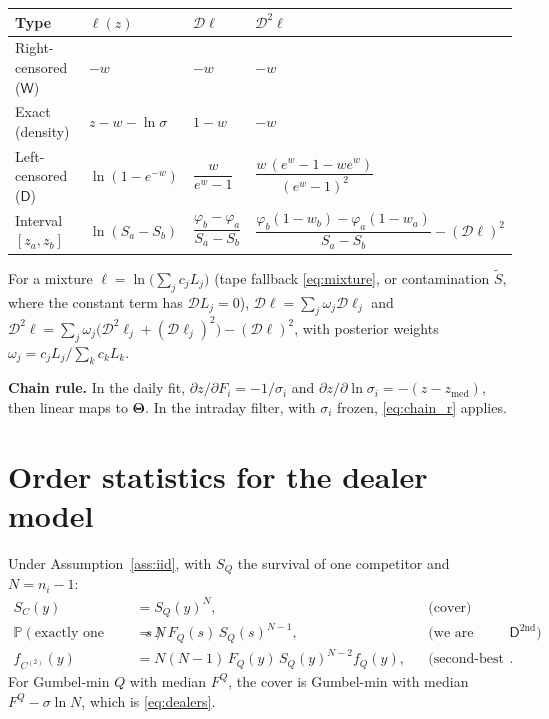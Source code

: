 \documentclass[11pt,a4paper]{article}
\theoremstyle{definition}
\theoremstyle{remark}
\newcommand{\Prob}{\mathbb{P}}
\newcommand{\zm}{z_{\mathrm{med}}}
\newcommand{\btheta}{\bm{\Theta}}
\newcommand{\Win}{\mathsf{W}}
\newcommand{\Dn}{\mathsf{D}}
\newcommand{\Dcv}{\mathsf{D}^{\mathrm{2nd}}}
\begin{document}
\begin{center}\small
\renewcommand{\arraystretch}{1.6}
\begin{tabular}{llll}
\toprule
Type & $\ell(z)$ & $\mathcal D\ell$ & $\mathcal D^2\ell$ \\
\midrule
Right-censored ($\Win$) & $-w$ & $-w$ & $-w$ \\
Exact (density) & $z-w-\ln\sigma$ & $1-w$ & $-w$ \\
Left-censored ($\Dn$) & $\ln(1-e^{-w})$ & $\dfrac{w}{e^{w}-1}$ & $\dfrac{w\,(e^{w}-1-we^{w})}{(e^{w}-1)^2}$ \\
Interval $[z_a,z_b]$ & $\ln(S_a-S_b)$ & $\dfrac{\varphi_b-\varphi_a}{S_a-S_b}$ & $\dfrac{\varphi_b(1-w_b)-\varphi_a(1-w_a)}{S_a-S_b}-(\mathcal D\ell)^2$ \\
\bottomrule
\end{tabular}
\end{center}

For a mixture $\ell=\ln\bigl(\sum_jc_jL_j\bigr)$ (tape fallback \eqref{eq:mixture}, or contamination $\tilde S$, where the constant term has $\mathcal D L_j=0$), $\mathcal D\ell=\sum_j\omega_j\mathcal D\ell_j$ and $\mathcal D^2\ell=\sum_j\omega_j\bigl(\mathcal D^2\ell_j+(\mathcal D\ell_j)^2\bigr)-(\mathcal D\ell)^2$, with posterior weights $\omega_j=c_jL_j/\sum_kc_kL_k$.

\textbf{Chain rule.} In the daily fit, $\partial z/\partial F_i=-1/\sigma_i$ and $\partial z/\partial\ln\sigma_i=-(z-\zm)$, then linear maps to $\btheta$. In the intraday filter, with $\sigma_i$ frozen, \eqref{eq:chain_r} applies.

\section{Order statistics for the dealer model}\label{app:orderstat}
Under Assumption~\ref{ass:iid}, with $S_Q$ the survival of one competitor and $N=n_i-1$:
\begin{align*}
S_C(y)&=S_Q(y)^{N}, &&\text{(cover)}\\
\Prob(\text{exactly one competitor below } s)&=N\,F_Q(s)\,S_Q(s)^{N-1}, &&\text{(we are second, $\Dcv$)}\\
f_{C^{(2)}}(y)&=N(N-1)\,F_Q(y)\,S_Q(y)^{N-2}f_Q(y), &&\text{(second-best competitor)}.
\end{align*}
For Gumbel-min $Q$ with median $F^Q$, the cover is Gumbel-min with median $F^Q-\sigma\ln N$, which is \eqref{eq:dealers}.
\end{document}

